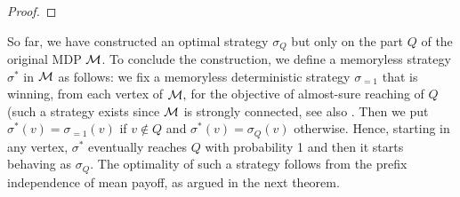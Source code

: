 \begin{proof}
%
%
%
%
\end{proof}

So far, we have constructed an optimal strategy $\sigma_Q$ but only on the part $Q$ of the original MDP $\mathcal{M}$. To conclude the construction, we define a memoryless strategy $\sigma^*$ in $\mathcal{M}$ as follows: we fix a memoryless deterministic strategy $\sigma_{=1}$ that is winning, from each vertex of $\mathcal{M},$ for the objective of almost-sure reaching of $Q$ (such a strategy exists since $\mathcal{M}$ is strongly connected, see also . Then we put $\sigma^*(v)=\sigma_{=1}(v)$ if $v\not\in Q$ and $\sigma^*(v)=\sigma_Q(v)$ otherwise. Hence, starting in any vertex, $\sigma^*$ eventually reaches $Q$ with probability 1 and then it starts behaving as $\sigma_Q$. The optimality of such a strategy follows from the prefix independence of mean payoff, as argued in the next theorem.

